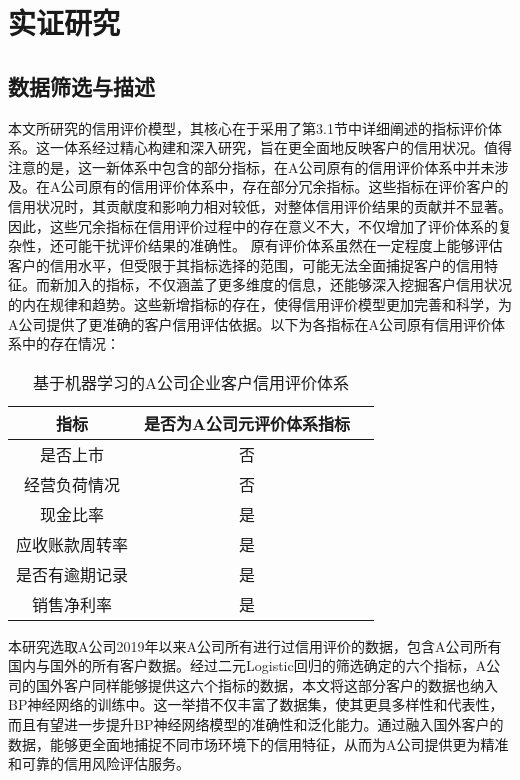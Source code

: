 \chapter{实证研究}

\section{数据筛选与描述}

本文所研究的信用评价模型，其核心在于采用了第3.1节中详细阐述的指标评价体系。这一体系经过精心构建和深入研究，旨在更全面地反映客户的信用状况。值得注意的是，这一新体系中包含的部分指标，在A公司原有的信用评价体系中并未涉及。在A公司原有的信用评价体系中，存在部分冗余指标。这些指标在评价客户的信用状况时，其贡献度和影响力相对较低，对整体信用评价结果的贡献并不显著。因此，这些冗余指标在信用评价过程中的存在意义不大，不仅增加了评价体系的复杂性，还可能干扰评价结果的准确性。
原有评价体系虽然在一定程度上能够评估客户的信用水平，但受限于其指标选择的范围，可能无法全面捕捉客户的信用特征。而新加入的指标，不仅涵盖了更多维度的信息，还能够深入挖掘客户信用状况的内在规律和趋势。这些新增指标的存在，使得信用评价模型更加完善和科学，为A公司提供了更准确的客户信用评估依据。以下为各指标在A公司原有信用评价体系中的存在情况： 


\begin{table}[h]
	\caption{基于机器学习的A公司企业客户信用评价体系}
	\label{tab:papercomponents}
	\centering
	\begin{tabular}{ccc}
		\toprule
		{\bfseries 指标} & {\bfseries 是否为A公司元评价体系指标}   \\
		\midrule
		是否上市 & 否 \\
		经营负荷情况   & 否 \\
		现金比率    &是\\
		应收账款周转率 &是   \\
		是否有逾期记录  & 是   \\
		销售净利率 & 是 \\
		\bottomrule
	\end{tabular}
\end{table}

本研究选取A公司2019年以来A公司所有进行过信用评价的数据，包含A公司所有国内与国外的所有客户数据。经过二元Logistic回归的筛选确定的六个指标，A公司的国外客户同样能够提供这六个指标的数据，本文将这部分客户的数据也纳入BP神经网络的训练中。这一举措不仅丰富了数据集，使其更具多样性和代表性，而且有望进一步提升BP神经网络模型的准确性和泛化能力。通过融入国外客户的数据，能够更全面地捕捉不同市场环境下的信用特征，从而为A公司提供更为精准和可靠的信用风险评估服务。

